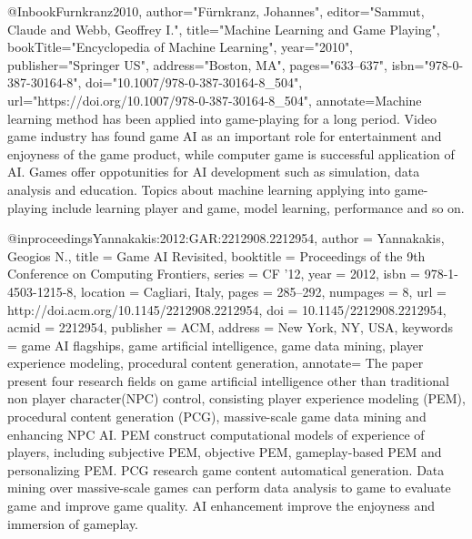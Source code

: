 @Inbook{Furnkranz2010,
  author="F{\"u}rnkranz, Johannes",
  editor="Sammut, Claude
  and Webb, Geoffrey I.",
  title="Machine Learning and Game Playing",
  bookTitle="Encyclopedia of Machine Learning",
  year="2010",
  publisher="Springer US",
  address="Boston, MA",
  pages="633--637",
  isbn="978-0-387-30164-8",
  doi="10.1007/978-0-387-30164-8_504",
  url="https://doi.org/10.1007/978-0-387-30164-8_504",
  annotate={Machine learning method has been applied into game-playing for a long period. Video game industry has found game AI as an important role for entertainment and enjoyness of the game product, while computer game is successful application of AI. Games offer oppotunities for AI development such as simulation, data analysis and education. Topics about machine learning applying into game-playing include learning player and game, model learning, performance and so on.}
}


@inproceedings{Yannakakis:2012:GAR:2212908.2212954,
  author = {Yannakakis, Geogios N.},
  title = {Game AI Revisited},
  booktitle = {Proceedings of the 9th Conference on Computing Frontiers},
  series = {CF '12},
  year = {2012},
  isbn = {978-1-4503-1215-8},
  location = {Cagliari, Italy},
  pages = {285--292},
  numpages = {8},
  url = {http://doi.acm.org/10.1145/2212908.2212954},
  doi = {10.1145/2212908.2212954},
  acmid = {2212954},
  publisher = {ACM},
  address = {New York, NY, USA},
  keywords = {game AI flagships, game artificial intelligence, game data mining, player experience modeling, procedural content generation},
  annotate={ The paper present four research fields on game artificial intelligence other than traditional non player character(NPC) control, consisting player experience modeling (PEM), procedural content generation (PCG), massive-scale game data mining and enhancing NPC AI. PEM construct computational models of experience of players, including subjective PEM, objective PEM, gameplay-based PEM and personalizing PEM. PCG research game content automatical generation. Data mining over massive-scale games can perform data analysis to game to evaluate game and improve game quality. AI enhancement improve the enjoyness and immersion of gameplay.}
} 


